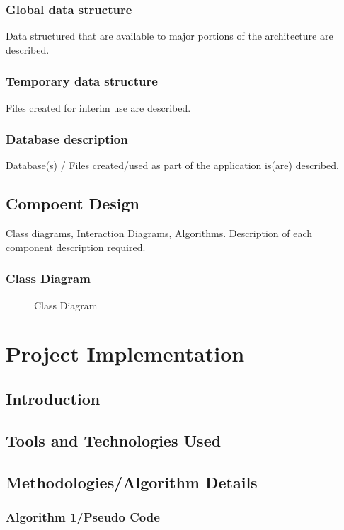 \documentclass[oneside,a4paper,12pt]{report}
\begin{document}
\subsection{Global data structure}
Data structured that are available to major portions of the architecture are described.
\subsection{Temporary data structure}
Files created for interim use are described.
\subsection{Database description}
Database(s) / Files created/used  as part of the application is(are) described.


\section{Compoent Design} 
Class diagrams, Interaction Diagrams, Algorithms. Description of each component description required.
\subsection{Class Diagram}
 \begin{center}
	\begin{figure}[!htbp]
		\centering
	  \caption{Class Diagram}
	  \label{fig:class-dig}
	\end{figure}
\end{center} 
 
\chapter{Project Implementation}
  \section{Introduction}
  \section{Tools and Technologies Used}
  \section{Methodologies/Algorithm Details}
  \subsection{Algorithm 1/Pseudo Code}
\end{document}
